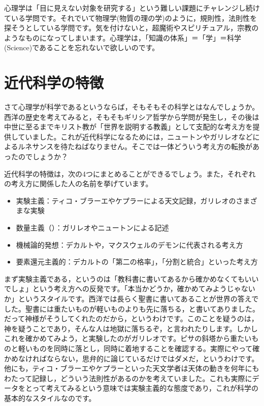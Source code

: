 \documentclass{ltjsbook}
\begin{document}
心理学は「目に見えない対象を研究する」という難しい課題にチャレンジし続けている学問です。それでいて物理学(物質の理の学)のように，規則性，法則性を探そうとしている学問です。気を付けないと，超魔術やスピリチュアル，宗教のようなものになってしまいます。心理学は，「知識の体系」＝「学」＝科学(Science)であることを忘れないで欲しいのです。

\section{近代科学の特徴}

さて心理学が科学であるというならば，そもそもその科学とはなんでしょうか。西洋の歴史を考えてみると，そもそもギリシア哲学から学問が発生し，その後は中世に至るまでキリスト教が「世界を説明する教義」として支配的な考え方を提供していました。これが近代科学になるためには，ニュートンやガリレオなどによるルネサンスを待たねばなりません。そこでは一体どういう考え方の転換があったのでしょうか？

近代科学の特徴は，次の4つにまとめることができるでしょう。また，それぞれの考え方に関係した人の名前を挙げています。
\begin{itemize}
	\item 実験主義：ティコ・ブラーエやケプラーによる天文記録，ガリレオのさまざまな実験
	\item 数量主義（）：ガリレオやニュートンによる記述
	\item 機械論的発想：デカルトや，マクスウェルのデモンに代表される考え方
	\item 要素還元主義的：デカルトの「第二の格率」，「分割と統合」といった考え方
\end{itemize}

まず実験主義である，というのは「教科書に書いてあるから確かめなくてもいいでしょ」という考え方への反発です。「本当かどうか，確かめてみようじゃないか」というスタイルです。西洋では長らく聖書に書いてあることが世界の答えでした。聖書には重たいものが軽いものよりも先に落ちる，と書いてありました。だって神様がそうしてくれたのだから，というわけです。このことを疑うのは，神を疑うことであり，そんな人は地獄に落ちるぞ，と言われたりします。しかしこれを確かめてみよう，と実験したのがガリレオです。ピサの斜塔から重たいものと軽いものを同時に落とし，同時に着地することを確認する。実際にやって確かめなければならない，思弁的に論じているだけではダメだ，というわけです。他にも，ティコ・ブラーエやケプラーといった天文学者は天体の動きを何年にもわたって記録し，どういう法則性があるのかを考えていました。これも実際にデータをとって考えてみるという意味では実験主義的な態度であり，これが科学の基本的なスタイルなのです。
\end{document}
